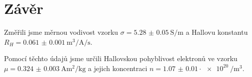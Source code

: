 \section*{Závěr}
Změřili jsme měrnou vodivost vzorku $\sigma = \SI{5.28(5)}{\siemens\per\meter}$ a Hallovu konstantu $R_H = \SI{0.061(1)}{\meter\cubed\per\ampere\per\second}$.

Pomocí těchto údajů jsme určili Hallovskou pohyblivost elektronů ve vzorku $\mu = \SI{0.324(3)}{\ampere\metre\squared\per\kg}$ a jejich koncentraci $n = \num{1.07(1)} \cdot \SI{e20}{\per\metre\cubed}$.